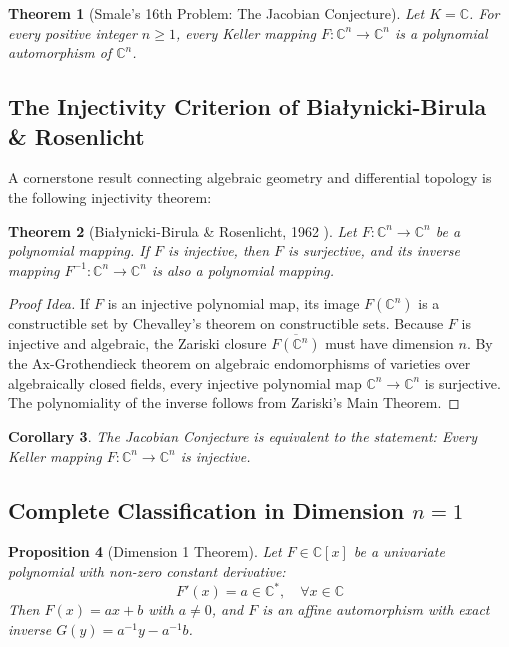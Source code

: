 \documentclass[11pt,a4paper]{article}
\newtheorem{theorem}{Theorem}[section]
\newtheorem{proposition}[theorem]{Proposition}
\newtheorem{corollary}[theorem]{Corollary}
\theoremstyle{definition}
\begin{document}
\begin{theorem}[Smale's 16th Problem: The Jacobian Conjecture]\label{thm:jacobian_conjecture}
Let $K = \mathbb{C}$. For every positive integer $n \ge 1$, every Keller mapping $F: \mathbb{C}^n \to \mathbb{C}^n$ is a polynomial automorphism of $\mathbb{C}^n$.
\end{theorem}

\subsection{The Injectivity Criterion of Bia\l ynicki-Birula \& Rosenlicht}
A cornerstone result connecting algebraic geometry and differential topology is the following injectivity theorem:

\begin{theorem}[Bia\l ynicki-Birula \& Rosenlicht, 1962 \cite{bbr1962}]\label{thm:bbr}
Let $F: \mathbb{C}^n \to \mathbb{C}^n$ be a polynomial mapping. If $F$ is injective, then $F$ is surjective, and its inverse mapping $F^{-1}: \mathbb{C}^n \to \mathbb{C}^n$ is also a polynomial mapping.
\end{theorem}

\begin{proof}[Proof Idea]
If $F$ is an injective polynomial map, its image $F(\mathbb{C}^n)$ is a constructible set by Chevalley's theorem on constructible sets. Because $F$ is injective and algebraic, the Zariski closure $\overline{F(\mathbb{C}^n)}$ must have dimension $n$. By the Ax-Grothendieck theorem on algebraic endomorphisms of varieties over algebraically closed fields, every injective polynomial map $\mathbb{C}^n \to \mathbb{C}^n$ is surjective. The polynomiality of the inverse follows from Zariski's Main Theorem.
\end{proof}

\begin{corollary}\label{cor:jc_injectivity}
The Jacobian Conjecture is equivalent to the statement: Every Keller mapping $F: \mathbb{C}^n \to \mathbb{C}^n$ is injective.
\end{corollary}

\subsection{Complete Classification in Dimension \texorpdfstring{$n = 1$}{n = 1}}

\begin{proposition}[Dimension 1 Theorem]\label{prop:dim_1}
Let $F \in \mathbb{C}[x]$ be a univariate polynomial with non-zero constant derivative:
\[ F'(x) = a \in \mathbb{C}^*, \quad \forall x \in \mathbb{C} \]
Then $F(x) = ax + b$ with $a \ne 0$, and $F$ is an affine automorphism with exact inverse $G(y) = a^{-1}y - a^{-1}b$.
\end{proposition}
\end{document}
